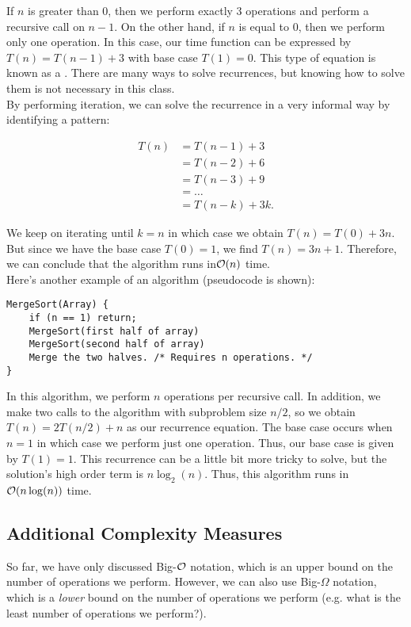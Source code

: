 If $n$ is greater than $0$, then we perform exactly $3$ operations and perform a recursive call on $n - 1$. On the other hand, if $n$ is equal to $0$, then we perform only one operation. In this case, our time function can be expressed by $T(n) = T(n - 1) + 3$ with base case $T(1) = 0$. This type of equation is known as a . There are many ways to solve recurrences, but knowing how to solve them is not necessary in this class. \\

\noindent By performing iteration, we can solve the recurrence in a very informal way by identifying a pattern:

\begin{align}
T(n) &= T(n - 1) + 3 \\
&= T(n - 2) + 6 \\
&= T(n - 3) + 9 \\
&= \ldots \\
&= T(n - k) + 3k.
\end{align}

We keep on iterating until $k = n$ in which case we obtain $T(n) = T(0) + 3n$. But since we have the base case $T(0) = 1$, we find $T(n) = 3n + 1$. Therefore, we can conclude that the algorithm runs in$\mathcal{O}(n)$ time. \\


Here's another example of an algorithm (pseudocode is shown):

\begin{lstlisting}
MergeSort(Array) {
    if (n == 1) return;
    MergeSort(first half of array)
    MergeSort(second half of array)
    Merge the two halves. /* Requires n operations. */
}
\end{lstlisting}

In this algorithm, we perform $n$ operations per recursive call. In addition, we make two calls to the algorithm with subproblem size $n/2$, so we obtain $T(n) = 2T(n/2) + n$ as our recurrence equation. The base case occurs when $n = 1$ in which case we perform just one operation. Thus, our base case is given by $T(1) = 1$.  This recurrence can be a little bit more tricky to solve, but the solution's high order term is $n\log_{2}(n)$. Thus, this algorithm runs in $\mathcal{O}(n\log(n))$ time. 


\subsection{Additional Complexity Measures}

So far, we have only discussed Big-$\mathcal{O}$ notation, which is an upper bound on the number of operations we perform. However, we can also use Big-$\Omega$ notation, which is a \textit{lower} bound on the number of operations we perform (e.g. what is the least number of operations we perform?). \\


